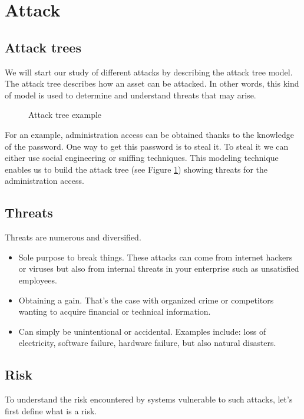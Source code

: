 \section{Attack}

\subsection{Attack trees}

We will start our study of different attacks by describing the attack tree model.
The attack tree describes how an asset can be attacked. In other words, this
kind of model is used to determine and understand threats that may arise.

\begin{figure}[htb]
\caption{Attack tree example}
\label{attack-tree}
\end{figure}

For an example, administration access can be obtained
thanks to the knowledge of the password. One way to get this password is to
steal it. To steal it we can either use social engineering or sniffing
techniques.
This modeling technique enables us to build the attack tree
(see Figure \ref{attack-tree}) showing threats for the administration access.

\subsection{Threats}

Threats are numerous and diversified.
\begin{itemize}
\item Sole purpose to break things.
	These attacks can come from internet hackers or viruses but also from
	internal threats in your enterprise such as unsatisfied employees.
\item Obtaining a gain.
	That's the case with organized crime or competitors wanting
	to acquire financial or technical information.
\item Can simply be unintentional or accidental.
	Examples include: loss of electricity, software failure, hardware
	failure, but also natural disasters.
\end{itemize}

\subsection{Risk}

To understand the risk encountered by systems vulnerable to such attacks, let's
first define what is a risk.


